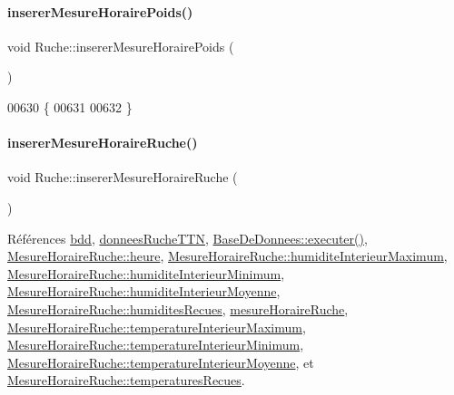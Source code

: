 \paragraph{\texorpdfstring{inserer\+Mesure\+Horaire\+Poids()}{insererMesureHorairePoids()}}
{\footnotesize\ttfamily void Ruche\+::inserer\+Mesure\+Horaire\+Poids (\begin{DoxyParamCaption}{ }\end{DoxyParamCaption})\hspace{0.3cm}{\ttfamily [private]}}


\begin{DoxyCode}
00630 \{
00631 
00632 \}
\end{DoxyCode}
\mbox{\label{class_ruche_a3a093c088d9c97f347394c8a681f7302}} 
\paragraph{\texorpdfstring{inserer\+Mesure\+Horaire\+Ruche()}{insererMesureHoraireRuche()}}
{\footnotesize\ttfamily void Ruche\+::inserer\+Mesure\+Horaire\+Ruche (\begin{DoxyParamCaption}{ }\end{DoxyParamCaption})\hspace{0.3cm}{\ttfamily [private]}}



Références \hyperlink{class_ruche_a8577fdedabdecd98652e338e83bb3b65}{bdd}, \hyperlink{class_ruche_a4556832042641c08a6ef2ab9d80d771e}{donnees\+Ruche\+T\+TN}, \hyperlink{class_base_de_donnees_aa8de5f8f8bb17edc43f5c0ee33712081}{Base\+De\+Donnees\+::executer()}, \hyperlink{struct_mesure_horaire_ruche_ab679cc7168deb6c3d2458c99b94e0611}{Mesure\+Horaire\+Ruche\+::heure}, \hyperlink{struct_mesure_horaire_ruche_ac8733bd08c235de27dd3eea85749c3f6}{Mesure\+Horaire\+Ruche\+::humidite\+Interieur\+Maximum}, \hyperlink{struct_mesure_horaire_ruche_adf0cbf1a3451cced1ba6fb9573654236}{Mesure\+Horaire\+Ruche\+::humidite\+Interieur\+Minimum}, \hyperlink{struct_mesure_horaire_ruche_a46f517d342e230b4e3d0b84a96b79aac}{Mesure\+Horaire\+Ruche\+::humidite\+Interieur\+Moyenne}, \hyperlink{struct_mesure_horaire_ruche_a4f825f05bf4e61db7b18a08dee759b7a}{Mesure\+Horaire\+Ruche\+::humidites\+Recues}, \hyperlink{class_ruche_a9a68d3b7eb272e139f1532fdcbca2da3}{mesure\+Horaire\+Ruche}, \hyperlink{struct_mesure_horaire_ruche_a746c391a70735bfff63bf7271ab28ab8}{Mesure\+Horaire\+Ruche\+::temperature\+Interieur\+Maximum}, \hyperlink{struct_mesure_horaire_ruche_a51c45378a78c733704df79b38d61afcc}{Mesure\+Horaire\+Ruche\+::temperature\+Interieur\+Minimum}, \hyperlink{struct_mesure_horaire_ruche_ac240bf701116e1a09f2bf33911bf57ef}{Mesure\+Horaire\+Ruche\+::temperature\+Interieur\+Moyenne}, et \hyperlink{struct_mesure_horaire_ruche_ade9984cb0f2c62b3ba1369f77249bb4a}{Mesure\+Horaire\+Ruche\+::temperatures\+Recues}.




